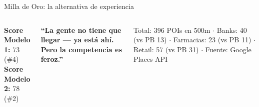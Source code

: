 \documentclass[aspectratio=169, 11pt]{beamer}
\begin{document}
\begin{frame}{Milla de Oro: la alternativa de experiencia}
\begin{columns}[T]
\vspace{6pt}
{\scriptsize
\textbf{Score Modelo 1:} 73 (\#4)\\
\textbf{Score Modelo 2:} 78 (\#2)
}

\vspace{6pt}
{\scriptsize\textcolor{hptu}{\textbf{``La gente no tiene que llegar --- ya est\'{a} ah\'{i}. Pero la competencia es feroz.''}}}

\vspace{4pt}
{\tiny\color{slate} Total: 396 POIs en 500m $\cdot$ Banks: 40 (vs PB 13) $\cdot$ Farmacias: 23 (vs PB 11) $\cdot$ Retail: 57 (vs PB 31) $\cdot$ Fuente: Google Places API}
\end{columns}
\end{frame}

\end{document}
